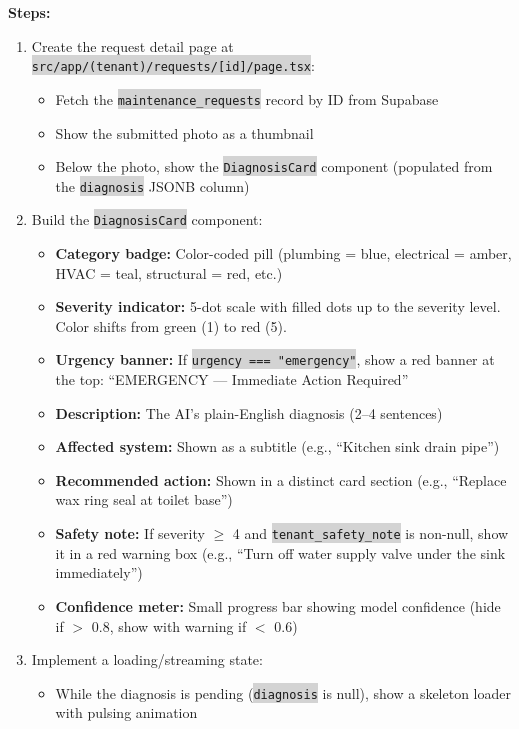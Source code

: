 \documentclass[11pt, a4paper]{article}
\newcommand{\code}[1]{\texttt{\small\colorbox{lightgray}{#1}}}
\begin{document}
\textbf{Steps:}
\begin{enumerate}[leftmargin=2em, itemsep=2pt]
  \item Create the request detail page at \code{src/app/(tenant)/requests/[id]/page.tsx}:
    \begin{itemize}[itemsep=1pt]
      \item Fetch the \code{maintenance\_requests} record by ID from Supabase
      \item Show the submitted photo as a thumbnail
      \item Below the photo, show the \code{DiagnosisCard} component (populated from the \code{diagnosis} JSONB column)
    \end{itemize}
  \item Build the \code{DiagnosisCard} component:
    \begin{itemize}[itemsep=1pt]
      \item \textbf{Category badge:} Color-coded pill (plumbing = blue, electrical = amber, HVAC = teal, structural = red, etc.)
      \item \textbf{Severity indicator:} 5-dot scale with filled dots up to the severity level. Color shifts from green (1) to red (5).
      \item \textbf{Urgency banner:} If \code{urgency === "emergency"}, show a red banner at the top: ``EMERGENCY --- Immediate Action Required''
      \item \textbf{Description:} The AI's plain-English diagnosis (2--4 sentences)
      \item \textbf{Affected system:} Shown as a subtitle (e.g., ``Kitchen sink drain pipe'')
      \item \textbf{Recommended action:} Shown in a distinct card section (e.g., ``Replace wax ring seal at toilet base'')
      \item \textbf{Safety note:} If severity $\geq$ 4 and \code{tenant\_safety\_note} is non-null, show it in a red warning box (e.g., ``Turn off water supply valve under the sink immediately'')
      \item \textbf{Confidence meter:} Small progress bar showing model confidence (hide if $>$ 0.8, show with warning if $<$ 0.6)
    \end{itemize}
  \item Implement a loading/streaming state:
    \begin{itemize}[itemsep=1pt]
      \item While the diagnosis is pending (\code{diagnosis} is null), show a skeleton loader with pulsing animation

\end{itemize}
\end{enumerate}
\end{document}
